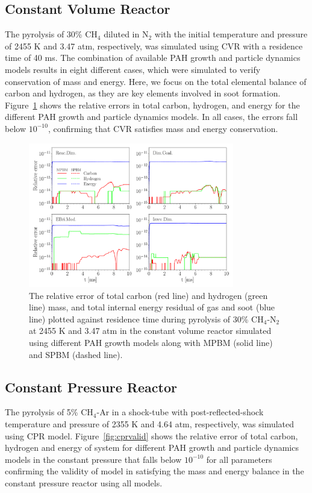 \subsection{Constant Volume Reactor}
The pyrolysis of 30\% $\mathrm{CH_4}$ diluted in $\mathrm{N_2}$ with the initial temperature and pressure of 2455 K and 3.47 atm, respectively, was simulated using CVR with a residence time of 40 ms. The combination of available PAH growth and particle dynamics models results in eight different cases, which were simulated to verify conservation of mass and energy. Here, we focus on the total elemental balance of carbon and hydrogen, as they are key elements involved in soot formation.
Figure~\ref{fig:constuvvalid} shows the relative errors in total carbon, hydrogen, and energy for the different PAH growth and particle dynamics models. In all cases, the errors fall below $\mathrm{10^{-10}}$, confirming that CVR satisfies mass and energy conservation.
\begin{figure}[H]
	\centering
	\includegraphics[width=0.8\textwidth]{Figures/Results/Validation/ConstUV/relerr_constuv.pdf}
	\caption{The relative error of total carbon (red line) and hydrogen (green line) mass, and total internal energy residual of gas and soot (blue line) plotted against residence time during pyrolysis of 30\% $\mathrm{CH_4}$-$\mathrm{N_2}$ at 2455 K and 3.47 atm in the constant volume reactor simulated using different PAH growth models along with MPBM (solid line) and SPBM (dashed line).}
	\label{fig:constuvvalid}
\end{figure}


\subsection{Constant Pressure Reactor}
The pyrolysis of 5\% $\mathrm{CH_4}$-Ar in a shock-tube with post-reflected-shock temperature and pressure of 2355 K and 4.64 atm, respectively, was simulated using CPR model. Figure~\ref{fig:cprvalid} shows the relative error of total carbon, hydrogen and energy of system for different PAH growth and particle dynamics models in the constant pressure that falls below $\mathrm{10^{-10}}$ for all parameters confirming the validity of model in satisfying the mass and energy balance in the constant pressure reactor using all models.

